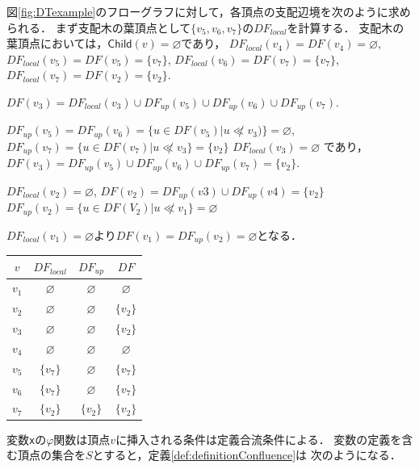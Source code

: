 \documentclass[dvipdfmx,a4j]{jbook}
\begin{document}
\begin{Exmp}
    図\ref{fig:DTexample}のフローグラフに対して，各頂点の支配辺境を次のように求められる．
    まず支配木の葉頂点として$\{v_5,v_6,v_7\}$の$DF_{local}$を計算する．
    支配木の葉頂点においては，$\mathsf{Child}(v)=\varnothing$であり，
    $DF_{local}(v_4)=DF(v_4)=\varnothing$,$DF_{local}(v_5)=DF(v_5)=\{v_7\}$,
    $DF_{local}(v_6)=DF(v_7)=\{v_7\}$, $DF_{local}(v_7)=DF(v_2)=\{v_2\}$.

    $DF(v_3)=DF_{local}(v_3)\cup DF_{up}(v_5)\cup DF_{up}(v_6)\cup DF_{up}(v_7)$.

    $DF_{up}(v_5)=DF_{up}(v_6)=\{u\in DF(v_5)|u\not\ll v_3)\}=\varnothing$,
    $DF_{up}(v_7)=\{u\in DF(v_7)|u\not\ll v_3\}=\{v_2\}$
    $DF_{local}(v_3)=\varnothing$ であり，$DF(v_3)=DF_{up}(v_5)\cup DF_{up}(v_6)\cup DF_{up}(v_7)=\{v_2\}$.

    $DF_{local}(v_2)=\varnothing$, $DF(v_2)=DF_{up}(v3)\cup DF_{up}(v4)=\{v_2\}$
    $DF_{up}(v_2)=\{u\in DF(V_2)|u\not\ll v_1\}=\varnothing$

    $DF_{local}(v_1)=\varnothing$より$DF(v_1)=DF_{up}(v_2)=\varnothing$となる．
    \begin{center}
        \begin{tabular}{|c|c|c|c|}\hline
            $v$   & $DF_{local}$  & $DF_{up}$     & $DF$          \\\hline
            $v_1$ & $\varnothing$ & $\varnothing$ & $\varnothing$ \\\hline
            $v_2$ & $\varnothing$ & $\varnothing$ & $\{v_2\}$     \\\hline
            $v_3$ & $\varnothing$ & $\varnothing$ & $\{v_2\}$     \\\hline
            $v_4$ & $\varnothing$ & $\varnothing$ & $\varnothing$ \\\hline
            $v_5$ & $\{v_7\}$     & $\varnothing$ & $\{v_7\}$     \\\hline
            $v_6$ & $\{v_7\}$     & $\varnothing$ & $\{v_7\}$     \\\hline
            $v_7$ & $\{v_2\}$     & $\{v_2\}$     & $\{v_2\}$     \\\hline
        \end{tabular}
    \end{center}
\end{Exmp}

変数\verb|x|の$\varphi$関数は頂点$v$に挿入される条件は定義合流条件による．
変数の定義を含む頂点の集合を$S$とすると，定義\ref{def:definitionConfluence}は
次のようになる．
\end{document}
